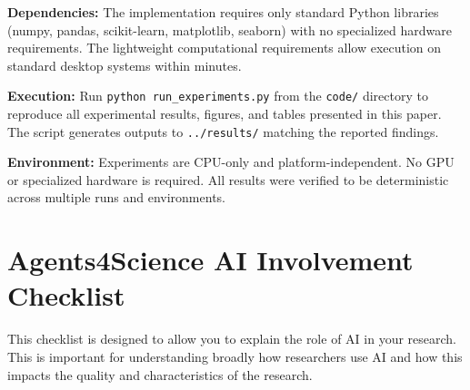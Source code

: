 \documentclass{article}
\begin{document}
\textbf{Dependencies:} The implementation requires only standard Python libraries (numpy, pandas, scikit-learn, matplotlib, seaborn) with no specialized hardware requirements. The lightweight computational requirements allow execution on standard desktop systems within minutes.

\textbf{Execution:} Run \texttt{python run\_experiments.py} from the \texttt{code/} directory to reproduce all experimental results, figures, and tables presented in this paper. The script generates outputs to \texttt{../results/} matching the reported findings.

\textbf{Environment:} Experiments are CPU-only and platform-independent. No GPU or specialized hardware is required. All results were verified to be deterministic across multiple runs and environments.

\section*{Agents4Science AI Involvement Checklist}

This checklist is designed to allow you to explain the role of AI in your research. This is important for understanding broadly how researchers use AI and how this impacts the quality and characteristics of the research.
\end{document}
